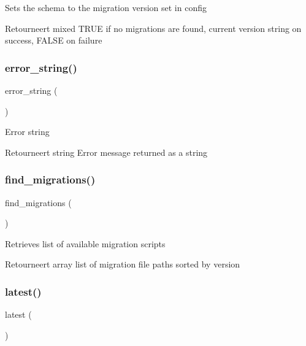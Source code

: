 Sets the schema to the migration version set in config

\begin{DoxyReturn}{Retourneert}
mixed T\+R\+UE if no migrations are found, current version string on success, F\+A\+L\+SE on failure 
\end{DoxyReturn}
\mbox{\label{class_c_i___migration_aad434fa9bec99e30d6a86beb5c2607df}} 
\subsubsection{\texorpdfstring{error\_string()}{error\_string()}}
{\footnotesize\ttfamily error\+\_\+string (\begin{DoxyParamCaption}{ }\end{DoxyParamCaption})}

Error string

\begin{DoxyReturn}{Retourneert}
string Error message returned as a string 
\end{DoxyReturn}
\mbox{\label{class_c_i___migration_a6581e916a05e39e46c09fe9878b2d93a}} 
\subsubsection{\texorpdfstring{find\_migrations()}{find\_migrations()}}
{\footnotesize\ttfamily find\+\_\+migrations (\begin{DoxyParamCaption}{ }\end{DoxyParamCaption})}

Retrieves list of available migration scripts

\begin{DoxyReturn}{Retourneert}
array list of migration file paths sorted by version 
\end{DoxyReturn}
\mbox{\label{class_c_i___migration_a23502a9f08bfc74caf3914113d11db2b}} 
\subsubsection{\texorpdfstring{latest()}{latest()}}
{\footnotesize\ttfamily latest (\begin{DoxyParamCaption}{ }\end{DoxyParamCaption})}

